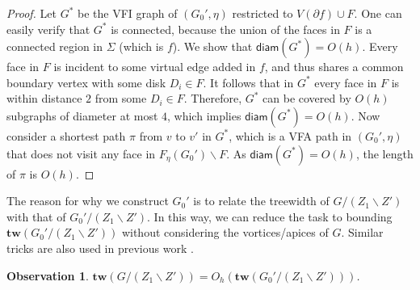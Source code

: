 \documentclass[a4paper,11pt]{article}
\numberwithin{lemma}{section}
\newtheorem{observation}[lemma]{Observation}
\newcommand{\tw}{\mathbf{tw}}
\begin{document}
\begin{proof}
Let $G^*$ be the VFI graph of $(G_0',\eta)$ restricted to $V(\partial f) \cup F$.
One can easily verify that $G^*$ is connected, because the union of the faces in $F$ is a connected region in $\varSigma$ (which is $f$).
We show that $\mathsf{diam}(G^*) = O(h)$.
Every face in $F$ is incident to some virtual edge added in $f$, and thus shares a common boundary vertex with some disk $D_i \in F$.
It follows that in $G^*$ every face in $F$ is within distance $2$ from some $D_i \in F$.
Therefore, $G^*$ can be covered by $O(h)$ subgraphs of diameter at most $4$, which implies $\mathsf{diam}(G^*) = O(h)$.
Now consider a shortest path $\pi$ from $v$ to $v'$ in $G^*$, which is a VFA path in $(G_0',\eta)$ that does not visit any face in $F_\eta(G_0') \backslash F$.
As $\mathsf{diam}(G^*) = O(h)$, the length of $\pi$ is $O(h)$.
\end{proof}

The reason for why we construct $G_0'$ is to relate the treewidth of $G/(Z_1 \backslash Z')$ with that of $G_0'/(Z_1 \backslash Z')$.
In this way, we can reduce the task to bounding $\tw(G_0'/(Z_1 \backslash Z'))$ without considering the vortices/apices of $G$.
Similar tricks are also used in previous work \cite{BandyapadhyayLLSJ22,DemaineFHT05}.

\begin{observation}\label{obs-GtoG0'}
$\tw(G/(Z_1 \backslash Z')) = O_h(\tw(G_0'/(Z_1 \backslash Z')))$.
\end{observation}
\end{document}
